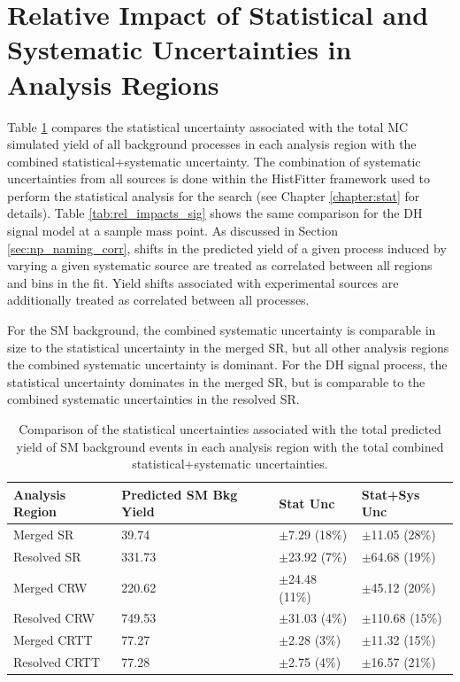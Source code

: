\section{Relative Impact of Statistical and Systematic Uncertainties in Analysis Regions}

Table \ref{tab:rel_impacts_bkg} compares the statistical uncertainty associated with the total MC simulated yield of all background processes in each analysis region with the combined statistical+systematic uncertainty. The combination of systematic uncertainties from all sources is done within the HistFitter framework used to perform the statistical analysis for the search (see Chapter \ref{chapter:stat} for details). Table \ref{tab:rel_impacts_sig} shows the same comparison for the DH signal model at a sample mass point. As discussed in Section \ref{sec:np_naming_corr}, shifts in the predicted yield of a given process induced by varying a given systematic source are treated as correlated between all regions and bins in the fit. Yield shifts associated with experimental sources are additionally treated as correlated between all processes. 

For the SM background, the combined systematic uncertainty is comparable in size to the statistical uncertainty in the merged SR, but all other analysis regions the combined systematic uncertainty is dominant. For the DH signal process, the statistical uncertainty dominates in the merged SR, but is comparable to the combined systematic uncertainties in the resolved SR.

\begin{table}[ht]
\begin{center}
\caption[Comparison of the statistical uncertainties associated with the total predicted yield of SM background events in each analysis region with the total combined statistical+systematic uncertainties.]{\label{tab:rel_impacts_bkg} Comparison of the statistical uncertainties associated with the total predicted yield of SM background events in each analysis region with the total combined statistical+systematic uncertainties.}
\begin{tabular}{l l l l }
\toprule
\textbf{Analysis Region}& \textbf{Predicted SM Bkg Yield} & \textbf{Stat Unc} & \textbf{Stat+Sys Unc} \tabularnewline
\midrule
\midrule
Merged SR & 39.74 & \(\pm\)7.29 (18\%) & \(\pm\)11.05 (28\%) \tabularnewline
\midrule
Resolved SR & 331.73 & \(\pm\)23.92 (7\%) & \(\pm\)64.68 (19\%) \tabularnewline
\midrule
Merged CRW & 220.62 & \(\pm\)24.48 (11\%) & \(\pm\)45.12 (20\%) \tabularnewline
\midrule
Resolved CRW & 749.53 & \(\pm\)31.03 (4\%) & \(\pm\)110.68 (15\%) \tabularnewline
\midrule
Merged CRTT & 77.27 & \(\pm\)2.28 (3\%) & \(\pm\)11.32 (15\%) \tabularnewline
\midrule
Resolved CRTT & 77.28 & \(\pm\)2.75 (4\%) & \(\pm\)16.57 (21\%) \tabularnewline
\bottomrule
\end{tabular}
\end{center}
\end{table}

